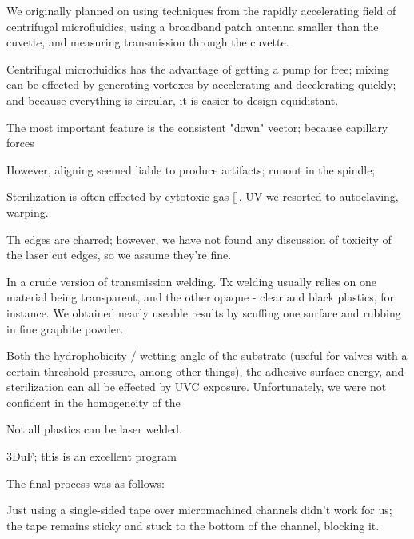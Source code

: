 \documentclass[paper.tex]{subfiles}
\begin{document}
We originally planned on using techniques from the rapidly accelerating field of centrifugal microfluidics, using a broadband patch antenna smaller than the cuvette, and measuring transmission through the cuvette.

Centrifugal microfluidics has the advantage of getting a pump for free; mixing can be effected by generating vortexes by accelerating and decelerating quickly; and because everything is circular, it is easier to design equidistant.

The most important feature is the consistent "down" vector; because capillary forces 

However, aligning seemed liable to produce artifacts; runout in the spindle;


Sterilization is often effected by cytotoxic gas []. UV we resorted to autoclaving, warping.

Th edges are charred; however, we have not found any discussion of toxicity of the laser cut edges, so we assume they're fine.


In a crude version of transmission welding. Tx welding usually relies on one material being transparent, and the other opaque - clear and black plastics, for instance. We obtained nearly useable results by scuffing one surface and rubbing in fine graphite powder.

Both the hydrophobicity / wetting angle of the substrate (useful for valves with a certain threshold pressure, among other things), the adhesive surface energy, and sterilization can all be effected by UVC exposure. Unfortunately, we were not confident in the homogeneity of the 

Not all plastics can be laser welded.

3DuF; this is an excellent program 



The final process was as follows:

Just using a single-sided tape over micromachined channels didn't work for us; the tape remains sticky and stuck to the bottom of the channel, blocking it.
\end{document}
